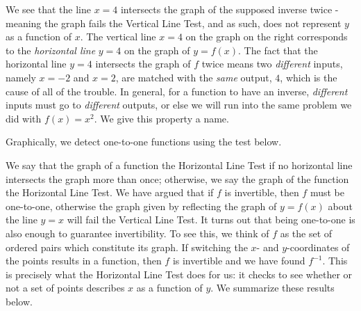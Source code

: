 
We see that the line $x=4$ intersects the graph of the supposed inverse twice - meaning the graph fails the Vertical Line Test, and as such, does not represent $y$ as a function of $x$.  The vertical line $x=4$ on the graph on the right corresponds to the \textit{horizontal line} $y=4$ on the graph of $y=f(x)$.  The fact that the horizontal line $y=4$ intersects the graph of $f$ twice means two \textit{different} inputs, namely $x=-2$ and $x=2$, are matched with the \textit{same} output, $4$, which is the cause of all of the trouble.  In general, for a function to have an inverse, \textit{different} inputs must go to \textit{different} outputs, or else we will run into the same problem we did with $f(x) = x^2$.  We give this property a name.

\smallskip


\smallskip

Graphically, we detect one-to-one functions using the test below.

\smallskip


\smallskip

We say that the graph of a function  the Horizontal Line Test  if no horizontal line intersects the graph more than once; otherwise, we say the graph of the function  the Horizontal Line Test.  We have argued that if $f$ is invertible, then $f$ must be one-to-one, otherwise the graph given by reflecting the graph of $y = f(x)$ about the line $y = x$ will fail the Vertical Line Test. It turns out that being one-to-one is also enough to guarantee invertibility.  To see this, we think of $f$ as the set of ordered pairs which constitute its graph.  If switching the $x$- and $y$-coordinates of the points results in a function, then $f$ is invertible and we have found $f^{-1}$. This is precisely what the Horizontal Line Test does for us:  it checks to see whether or not a set of points describes $x$ as a function of $y$.  We summarize these results below.
  
